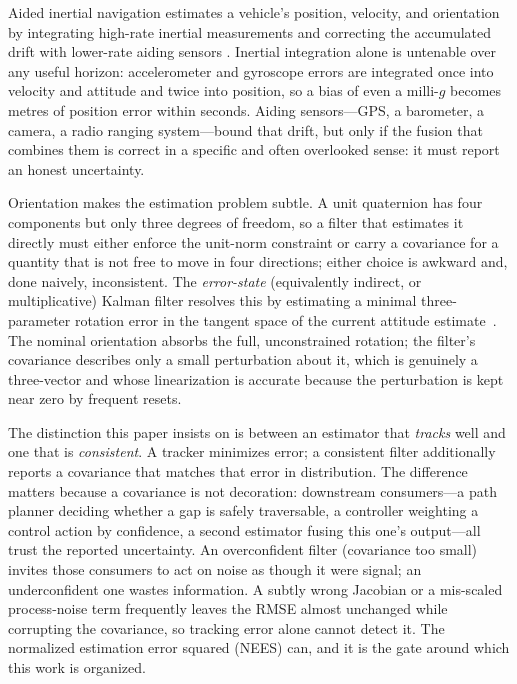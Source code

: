 \documentclass[11pt]{article}
\begin{document}
Aided inertial navigation estimates a vehicle's position, velocity, and orientation by integrating
high-rate inertial measurements and correcting the accumulated drift with lower-rate aiding sensors
\cite{farrell2008,groves2013,titterton2004}. Inertial integration alone is untenable over any useful
horizon: accelerometer and gyroscope errors are integrated once into velocity and attitude and twice
into position, so a bias of even a milli-$g$ becomes metres of position error within seconds. Aiding
sensors---GPS, a barometer, a camera, a radio ranging system---bound that drift, but only if the fusion
that combines them is correct in a specific and often overlooked sense: it must report an honest
uncertainty.

Orientation makes the estimation problem subtle. A unit quaternion has four components but only three
degrees of freedom, so a filter that estimates it directly must either enforce the unit-norm
constraint or carry a covariance for a quantity that is not free to move in four directions; either
choice is awkward and, done naively, inconsistent. The \emph{error-state} (equivalently indirect, or
multiplicative) Kalman filter resolves this by estimating a minimal three-parameter rotation error in
the tangent space of the current attitude estimate~\cite{markley2003,lefferts1982,sola2017}. The
nominal orientation absorbs the full, unconstrained rotation; the filter's covariance describes only a
small perturbation about it, which is genuinely a three-vector and whose linearization is accurate
because the perturbation is kept near zero by frequent resets.

The distinction this paper insists on is between an estimator that \emph{tracks} well and one that is
\emph{consistent}. A tracker minimizes error; a consistent filter additionally reports a covariance
that matches that error in distribution. The difference matters because a covariance is not decoration:
downstream consumers---a path planner deciding whether a gap is safely traversable, a controller
weighting a control action by confidence, a second estimator fusing this one's output---all trust the
reported uncertainty. An overconfident filter (covariance too small) invites those consumers to act on
noise as though it were signal; an underconfident one wastes information. A subtly wrong Jacobian or a
mis-scaled process-noise term frequently leaves the RMSE almost unchanged while corrupting the
covariance, so tracking error alone cannot detect it. The normalized estimation error squared (NEES)
can, and it is the gate around which this work is organized.
\end{document}
